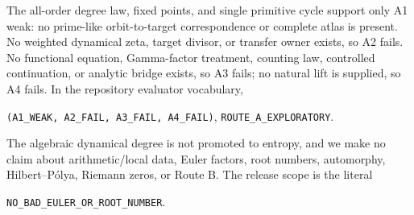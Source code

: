 \documentclass[10pt]{article}
\begin{document}
The all-order degree law, fixed points, and single primitive cycle support only
A1 weak: no prime-like orbit-to-target correspondence or complete atlas is
present.  No weighted dynamical zeta, target divisor, or transfer owner exists,
so A2 fails.  No functional equation, Gamma-factor treatment, counting law,
controlled continuation, or analytic bridge exists, so A3 fails; no natural
lift is supplied, so A4 fails.  In the repository evaluator vocabulary,
\begin{center}
\texttt{(A1\_WEAK, A2\_FAIL, A3\_FAIL, A4\_FAIL)},\quad
\texttt{ROUTE\_A\_EXPLORATORY}.
\end{center}
The algebraic dynamical degree is not promoted to entropy, and we make no
claim about arithmetic/local data, Euler factors, root numbers, automorphy,
Hilbert--P\'olya, Riemann zeros, or Route B.  The release scope is the literal
\begin{center}
\texttt{NO\_BAD\_EULER\_OR\_ROOT\_NUMBER}.
\end{center}
\end{document}
